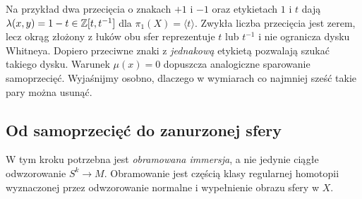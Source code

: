 Na przykład dwa przecięcia o znakach $+1$ i $-1$
oraz etykietach $1$ i $t$ dają
$\lambda(x,y)=1-t\in\mathbb{Z}[t,t^{-1}]$ dla
$\pi_1(X)=\langle t\rangle$. Zwykła liczba
przecięcia jest zerem, lecz okrąg złożony z
łuków obu sfer reprezentuje $t$ lub $t^{-1}$
i nie ogranicza
dysku Whitneya. Dopiero przeciwne znaki z
\emph{jednakową} etykietą pozwalają szukać
takiego dysku. Warunek $\mu(x)=0$ dopuszcza
analogiczne sparowanie samoprzecięć. Wyjaśnijmy
osobno, dlaczego w wymiarach co najmniej sześć
takie pary można usunąć.

\subsection*{Od samoprzecięć do zanurzonej sfery}
W tym kroku potrzebna jest \emph{obramowana
immersja}, a nie jedynie ciągłe odwzorowanie
$S^k\to M$. Obramowanie jest częścią klasy
regularnej homotopii wyznaczonej przez odwzorowanie
normalne i wypełnienie obrazu sfery w $X$.

